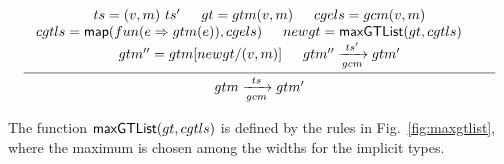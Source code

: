   \begin{gather*}
    \infer[]
    {\seqq{gtm \xrightarrow[gcm]{ts} gtm'}}
    {
    \begin{array}{c}
      ts = (v, m)\ ts' \hspace{15pt} gt = gtm(v, m) \hspace{15pt}
      cgels = gcm(v, m) \\
     cgtls = \fmap(fun (e \Rightarrow gtm(e)), cgels) \hspace{15pt}
     newgt = \maxgtlist(gt, cgtls) \hspace{15pt} \\
     gtm'' = gtm[newgt/(v, m)] \hspace{15pt}
     gtm'' \xrightarrow[gcm]{ts'} gtm'
    \end{array}
    }
\end{gather*}

The function ${\sf maxGTList}(gt, cgtls)$ is defined by the rules in Fig.~\ref{fig:maxgtlist}, where the maximum is chosen among the widths for the implicit types. 



